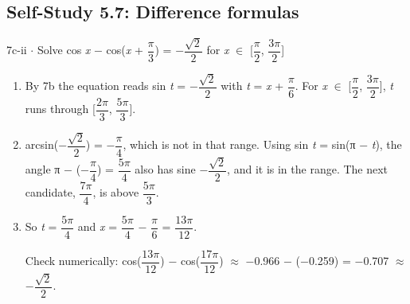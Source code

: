 \documentclass[11pt]{article}
\begin{document}
\begin{keepsection}\subsection{Self-Study 5.7: Difference formulas}

\begin{workedbox}{7c-ii \ensuremath{\cdot} Solve cos \textit{x} \ensuremath{-} cos(\textit{x} + {\small\ensuremath{\dfrac{π}{3}}}) = \ensuremath{-}{\small\ensuremath{\dfrac{\sqrt{2}}{2}}} for \textit{x} \ensuremath{\in} [{\small\ensuremath{\dfrac{π}{2}}}, {\small\ensuremath{\dfrac{3π}{2}}}]}
\begin{enumerate}
\item By 7b the equation reads sin \textit{t} = \ensuremath{-}{\small\ensuremath{\dfrac{\sqrt{2}}{2}}} with \textit{t} = \textit{x} + {\small\ensuremath{\dfrac{π}{6}}}. For \textit{x} \ensuremath{\in} [{\small\ensuremath{\dfrac{π}{2}}}, {\small\ensuremath{\dfrac{3π}{2}}}], \textit{t} runs through [{\small\ensuremath{\dfrac{2π}{3}}}, {\small\ensuremath{\dfrac{5π}{3}}}].
\item arcsin(\ensuremath{-}{\small\ensuremath{\dfrac{\sqrt{2}}{2}}}) = \ensuremath{-}{\small\ensuremath{\dfrac{π}{4}}}, which is not in that range. Using sin \textit{t} = sin(π \ensuremath{-} \textit{t}), the angle π \ensuremath{-} (\ensuremath{-}{\small\ensuremath{\dfrac{π}{4}}}) = {\small\ensuremath{\dfrac{5π}{4}}} also has sine \ensuremath{-}{\small\ensuremath{\dfrac{\sqrt{2}}{2}}}, and it is in the range. The next candidate, {\small\ensuremath{\dfrac{7π}{4}}}, is above {\small\ensuremath{\dfrac{5π}{3}}}.
\item {}
So \textit{t} = {\small\ensuremath{\dfrac{5π}{4}}} and \textit{x} = {\small\ensuremath{\dfrac{5π}{4}}} \ensuremath{-} {\small\ensuremath{\dfrac{π}{6}}} = {\small\ensuremath{\dfrac{13π}{12}}}.

Check numerically: cos({\small\ensuremath{\dfrac{13π}{12}}}) \ensuremath{-} cos({\small\ensuremath{\dfrac{17π}{12}}}) \ensuremath{\approx} \ensuremath{-}0.966 \ensuremath{-} (\ensuremath{-}0.259) = \ensuremath{-}0.707 \ensuremath{\approx} \ensuremath{-}{\small\ensuremath{\dfrac{\sqrt{2}}{2}}}.
\end{enumerate}
\end{workedbox}

\end{keepsection}
\end{document}

